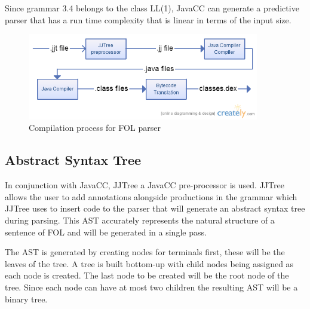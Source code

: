 Since grammar 3.4 belongs to the class LL(1), JavaCC can generate a predictive parser that has a run time complexity that is linear in terms of the input size.  

\begin{figure}[h]
\centering
\includegraphics[width=0.9\textwidth]{Images/compilation.png}
\caption{Compilation process for FOL parser}
\label{fig:Compilation}
\end{figure}

\subsection{Abstract Syntax Tree}

In conjunction with JavaCC,  JJTree a JavaCC pre-processor is used. JJTree allows the user to add annotations alongside productions in the grammar which JJTree uses to insert code to the parser that will generate an abstract syntax tree during parsing. This AST accurately represents the natural structure of a sentence of FOL and will be generated in a single pass.

The AST is generated by creating nodes for terminals first, these will be the leaves of the tree. A tree is built bottom-up with child nodes being assigned as each node is created. The last node to be created will be the root node of the tree. Since each node can have at most two children the resulting AST will be a binary tree.

